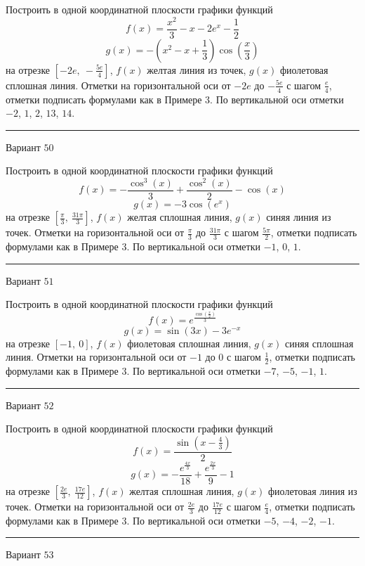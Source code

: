 \documentclass[11pt]{report}
\begin{document}
Построить в одной координатной плоскости графики функций $$f(x) = \frac{x^{2}}{3} - x - 2 e^{x} - \frac{1}{2}$$ $$g(x) = - \left(x^{2} - x + \frac{1}{3}\right) \cos{\left(\frac{x}{3} \right)}$$ на отрезке $\left[- 2 e, \  - \frac{5 e}{4}\right]$, $f(x)$ желтая линия из точек, $g(x)$ фиолетовая сплошная линия. Отметки на горизонтальной оси от $- 2 e$ до $- \frac{5 e}{4}$ с шагом $\frac{e}{4}$, отметки подписать формулами как в Примере 3. По вертикальной оси отметки $-2$, $1$, $2$, $13$, $14$.
\begin{center}
\noindent\rule{8cm}{0.4pt}
\end{center}
Вариант $50$


Построить в одной координатной плоскости графики функций $$f(x) = - \frac{\cos^{3}{\left(x \right)}}{3} + \frac{\cos^{2}{\left(x \right)}}{2} - \cos{\left(x \right)}$$ $$g(x) = - 3 \cos{\left(e^{x} \right)}$$ на отрезке $\left[\frac{\pi}{3}, \  \frac{31 \pi}{3}\right]$, $f(x)$ желтая сплошная линия, $g(x)$ синяя линия из точек. Отметки на горизонтальной оси от $\frac{\pi}{3}$ до $\frac{31 \pi}{3}$ с шагом $\frac{5 \pi}{2}$, отметки подписать формулами как в Примере 3. По вертикальной оси отметки $-1$, $0$, $1$.
\begin{center}
\noindent\rule{8cm}{0.4pt}
\end{center}
Вариант $51$


Построить в одной координатной плоскости графики функций $$f(x) = e^{\frac{\cos{\left(\frac{x}{2} \right)}}{3}}$$ $$g(x) = \sin{\left(3 x \right)} - 3 e^{- x}$$ на отрезке $\left[-1, \  0\right]$, $f(x)$ фиолетовая сплошная линия, $g(x)$ синяя сплошная линия. Отметки на горизонтальной оси от $-1$ до $0$ с шагом $\frac{1}{2}$, отметки подписать формулами как в Примере 3. По вертикальной оси отметки $-7$, $-5$, $-1$, $1$.
\begin{center}
\noindent\rule{8cm}{0.4pt}
\end{center}
Вариант $52$


Построить в одной координатной плоскости графики функций $$f(x) = \frac{\sin{\left(x - \frac{4}{3} \right)}}{2}$$ $$g(x) = - \frac{e^{\frac{4 x}{3}}}{18} + \frac{e^{\frac{2 x}{3}}}{9} - 1$$ на отрезке $\left[\frac{2 e}{3}, \  \frac{17 e}{12}\right]$, $f(x)$ желтая сплошная линия, $g(x)$ фиолетовая линия из точек. Отметки на горизонтальной оси от $\frac{2 e}{3}$ до $\frac{17 e}{12}$ с шагом $\frac{e}{4}$, отметки подписать формулами как в Примере 3. По вертикальной оси отметки $-5$, $-4$, $-2$, $-1$.
\begin{center}
\noindent\rule{8cm}{0.4pt}
\end{center}
Вариант $53$
\end{document}
